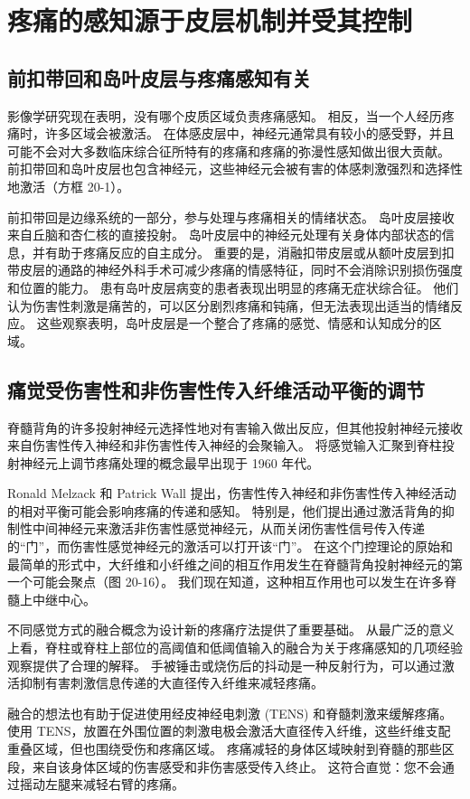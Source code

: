 \section{疼痛的感知源于皮层机制并受其控制}

\subsection{前扣带回和岛叶皮层与疼痛感知有关}
影像学研究现在表明，没有哪个皮质区域负责疼痛感知。 相反，当一个人经历疼痛时，许多区域会被激活。 在体感皮层中，神经元通常具有较小的感受野，并且可能不会对大多数临床综合征所特有的疼痛和疼痛的弥漫性感知做出很大贡献。 前扣带回和岛叶皮层也包含神经元，这些神经元会被有害的体感刺激强烈和选择性地激活（方框 20-1）。

前扣带回是边缘系统的一部分，参与处理与疼痛相关的情绪状态。 岛叶皮层接收来自丘脑和杏仁核的直接投射。 岛叶皮层中的神经元处理有关身体内部状态的信息，并有助于疼痛反应的自主成分。 重要的是，消融扣带皮层或从额叶皮层到扣带皮层的通路的神经外科手术可减少疼痛的情感特征，同时不会消除识别损伤强度和位置的能力。 患有岛叶皮层病变的患者表现出明显的疼痛无症状综合征。 他们认为伤害性刺激是痛苦的，可以区分剧烈疼痛和钝痛，但无法表现出适当的情绪反应。 这些观察表明，岛叶皮层是一个整合了疼痛的感觉、情感和认知成分的区域。

\subsection{痛觉受伤害性和非伤害性传入纤维活动平衡的调节}
脊髓背角的许多投射神经元选择性地对有害输入做出反应，但其他投射神经元接收来自伤害性传入神经和非伤害性传入神经的会聚输入。 将感觉输入汇聚到脊柱投射神经元上调节疼痛处理的概念最早出现于 1960 年代。

Ronald Melzack 和 Patrick Wall 提出，伤害性传入神经和非伤害性传入神经活动的相对平衡可能会影响疼痛的传递和感知。 特别是，他们提出通过激活背角的抑制性中间神经元来激活非伤害性感觉神经元，从而关闭伤害性信号传入传递的“门”，而伤害性感觉神经元的激活可以打开该“门”。 在这个门控理论的原始和最简单的形式中，大纤维和小纤维之间的相互作用发生在脊髓背角投射神经元的第一个可能会聚点（图 20-16）。 我们现在知道，这种相互作用也可以发生在许多脊髓上中继中心。

不同感觉方式的融合概念为设计新的疼痛疗法提供了重要基础。 从最广泛的意义上看，脊柱或脊柱上部位的高阈值和低阈值输入的融合为关于疼痛感知的几项经验观察提供了合理的解释。 手被锤击或烧伤后的抖动是一种反射行为，可以通过激活抑制有害刺激信息传递的大直径传入纤维来减轻疼痛。

融合的想法也有助于促进使用经皮神经电刺激 (TENS) 和脊髓刺激来缓解疼痛。 使用 TENS，放置在外围位置的刺激电极会激活大直径传入纤维，这些纤维支配重叠区域，但也围绕受伤和疼痛区域。 疼痛减轻的身体区域映射到脊髓的那些区段，来自该身体区域的伤害感受和非伤害感受传入终止。 这符合直觉：您不会通过摇动左腿来减轻右臂的疼痛。

